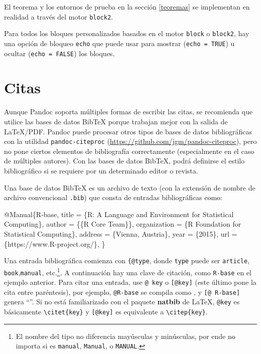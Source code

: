 \documentclass[12pt,]{krantz}
\makeatletter
\newenvironment{Shaded}{\begin{snugshade}}{\end{snugshade}}
\newcommand{\DataTypeTok}[1]{\textcolor[rgb]{0.13,0.29,0.53}{#1}}
\newcommand{\OtherTok}[1]{\textcolor[rgb]{0.56,0.35,0.01}{#1}}
\newcommand{\VariableTok}[1]{\textcolor[rgb]{0.00,0.00,0.00}{#1}}
\newcommand{\NormalTok}[1]{#1}
\newenvironment{kframe}{%
\medskip{}
\setlength{\fboxsep}{.8em}
 \def\at@end@of@kframe{}%
 \ifinner\ifhmode%
  \def\at@end@of@kframe{\end{minipage}}%
  \begin{minipage}{\columnwidth}%
 \fi\fi%
 \def\FrameCommand##1{\hskip\@totalleftmargin \hskip-\fboxsep
 \colorbox{shadecolor}{##1}\hskip-\fboxsep
     \hskip-\linewidth \hskip-\@totalleftmargin \hskip\columnwidth}%
 \MakeFramed {\advance\hsize-\width
   \@totalleftmargin\z@ \linewidth\hsize
   \@setminipage}}%
 {\par\unskip\endMakeFramed%
 \at@end@of@kframe}
\renewenvironment{Shaded}{\begin{kframe}}{\end{kframe}}
\theoremstyle{definition}
\theoremstyle{definition}
\theoremstyle{definition}
\theoremstyle{remark}
\makeatother
\begin{document}
El teorema y los entornos de prueba en la sección \ref{teoremas} se
implementan en realidad a través del motor \texttt{block2}.

Para todos los bloques personalizados basados en el motor \texttt{block}
o \texttt{block2}, hay una opción de bloqueo \texttt{echo} que puede
usar para mostrar (\texttt{echo\ =\ TRUE}) u ocultar
(\texttt{echo\ =\ FALSE}) los bloques.

\section{Citas}\label{citas}

Aunque Pandoc soporta múltiples formas de escribir las citas, se
recomienda que utilice las bases de datos BibTeX porque trabajan mejor
con la salida de LaTeX/PDF. Pandoc puede procesar otros tipos de bases
de datos bibliográficas con la utilidad \texttt{pandoc-citeproc}
(\url{https://github.com/jgm/pandoc-citeproc}), pero no pone ciertos
elementos de bibliografía correctamente (especialmente en el caso de
múltiples autores). Con las bases de datos BibTeX, podrá definirse el
estilo bibliográfico si se requiere por un determinado editor o revista.

Una base de datos BibTeX es un archivo de texto (con la extensión de
nombre de archivo convencional \texttt{.bib}) que consta de entradas
bibliográficas como:

\begin{Shaded}
\begin{Highlighting}[]
\VariableTok{@Manual}\NormalTok{\{}\OtherTok{R}\NormalTok{-}\OtherTok{base}\NormalTok{,}
  \DataTypeTok{title}\NormalTok{ = \{R: A Language and Environment for Statistical Computing\},}
  \DataTypeTok{author}\NormalTok{ = \{\{R Core Team\}\},}
  \DataTypeTok{organization}\NormalTok{ = \{R Foundation for Statistical Computing\},}
  \DataTypeTok{address}\NormalTok{ = \{Vienna, Austria\},}
  \DataTypeTok{year}\NormalTok{ = \{2015\},}
  \DataTypeTok{url}\NormalTok{ = \{https://www.R-project.org/\},}
\NormalTok{\}}
\end{Highlighting}
\end{Shaded}

Una entrada bibliográfica comienza con \texttt{\{@type}, donde
\texttt{type} puede ser \texttt{article}, \texttt{book},\texttt{manual},
etc.\footnote{El nombre del tipo no diferencia mayúsculas y minúsculas,
  por ende no importa si es \texttt{manual}, \texttt{Manual}, o
  \texttt{MANUAL}.}. A continuación hay una clave de citación, como
\texttt{R-base} en el ejemplo anterior. Para citar una entrada, use
\texttt{@\ key} o \texttt{{[}@key{]}} (este último pone la cita entre
paréntesis), por ejemplo, \texttt{@R-base} se compila como
\citet{R-base}, y \texttt{{[}@\ R-base{]}} genera ``\citep{R-base}''. Si
no está familiarizado con el paquete \textbf{natbib} de LaTeX,
\texttt{@key} es básicamente \texttt{\textbackslash{}citet\{key\}} y
\texttt{{[}@key{]}} es equivalente a
\texttt{\textbackslash{}citep\{key\}}.
\end{document}
